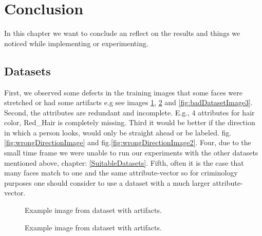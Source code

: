\documentclass[12pt, a4paper]{article}
\begin{document}
\section{Conclusion}
In this chapter we want to conclude an reflect on the results and things we noticed while implementing or experimenting.
\subsection{Datasets}
First, we observed some defects in the training images that some faces were stretched or had some artifacts e.g see images \ref{fig:badDatasetImage}, \ref{fig:badDatasetImage2} and \ref{fig:badDatasetImage3}.
Second, the attributes are redundant and incomplete. E.g., 4 attributes for hair color, Red\_Hair is completely missing. 
Third it would be better if the direction in which a person looks, would only be straight ahead or be labeled. fig.\ref{fig:wrongDirectionImage} and fig.\ref{fig:wrongDirectionImage2}.
Four, due to the small time frame we were unable to run our experiments with the other datasets mentioned above, chapter: \ref{SuitableDatasets}.
Fifth, often it is the case that many faces match to one and the same attribute-vector so for criminology purposes one should consider to use a dataset with a much larger attribute-vector.
\begin{figure}
    \caption{Example image from dataset with artifacts.}
    \label{fig:badDatasetImage}
\end{figure}
\begin{figure}
    \caption{Example image from dataset with artifacts.}
    \label{fig:badDatasetImage2}
\end{figure}
\end{document}
